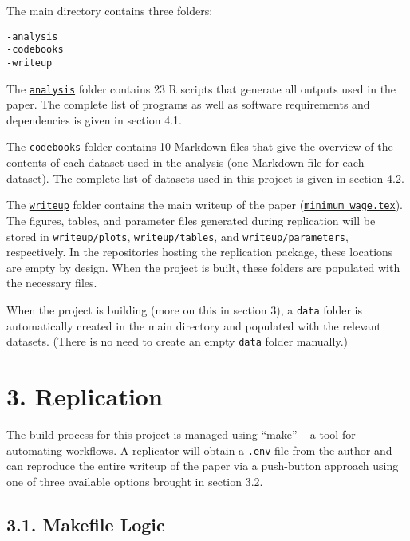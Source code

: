 \documentclass[10pt]{article}
\begin{document}
The main directory contains three folders:
\begin{verbatim}
-analysis
-codebooks
-writeup
\end{verbatim}

The \href{https://www.github.com/johnjosephhorton/minimum_wage/blob/main/analysis}{\texttt{analysis}} folder contains 23 R scripts that generate all outputs used in the paper.
The complete list of programs as well as software requirements and dependencies is given in section 4.1.

The \href{https://www.github.com/johnjosephhorton/minimum_wage/blob/main/codebooks}{\texttt{codebooks}} folder contains 10 Markdown files that give the overview of the contents of each dataset used in the analysis (one Markdown file for each dataset).
The complete list of datasets used in this project is given in section 4.2.

The \href{https://www.github.com/johnjosephhorton/minimum_wage/blob/main/writeup}{\texttt{writeup}} folder contains the main writeup of the paper (\href{https://www.github.com/johnjosephhorton/minimum_wage/blob/main/writeup/minimum\_wage.tex}{\texttt{minimum\_wage.tex}}). 
The figures, tables, and parameter files generated during replication will be stored in \texttt{writeup/plots}, \texttt{writeup/tables}, and \texttt{writeup/parameters}, respectively.
In the repositories hosting the replication package, these locations are empty by design.
When the project is built, these folders are populated with the necessary files. 

When the project is building (more on this in section 3), a \texttt{data} folder is automatically created in the main directory and populated with the relevant datasets.
(There is no need to create an empty \texttt{data} folder manually.)

\vspace{1em}
\section*{3. Replication}

The build process for this project is managed using ``\href{https://www.gnu.org/software/make/manual/make.html}{make}'' -- a tool for automating workflows.
A replicator will obtain a \texttt{.env} file from the author and can reproduce the entire writeup of the paper via a push-button approach using one of three available options brought in section 3.2.

\subsection*{3.1. Makefile Logic}
\end{document}
